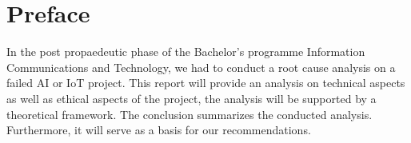 \chapter*{Preface}

In the post propaedeutic phase of the Bachelor’s programme Information Communications and Technology,
we had to conduct a root cause analysis on a failed AI or IoT project. This report will provide an analysis
on technical aspects as well as ethical aspects of the project, the analysis will be supported by
a theoretical framework. The conclusion summarizes the conducted analysis.
Furthermore, it will serve as a basis for our recommendations.